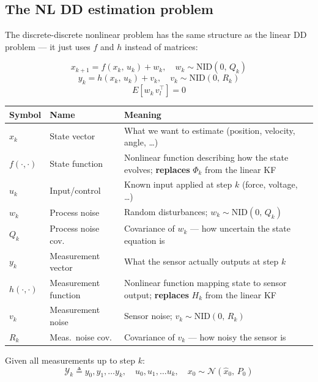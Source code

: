 \documentclass[12pt, a4paper]{article}
\begin{document}
\subsection*{The NL DD estimation problem}

The discrete-discrete nonlinear problem has the same structure as
the linear DD problem --- it just uses $f$ and $h$ instead of
matrices:

\[
  x_{k+1} = f(x_k,\, u_k) + w_k, \quad w_k \sim \mathrm{NID}(0,\, Q_k)
\]
\[
  y_k = h(x_k,\, u_k) + v_k, \quad v_k \sim \mathrm{NID}(0,\, R_k)
\]
\[
  E\!\left[w_k\, v_l^\top\right] = 0
\]

\begin{center}
\renewcommand{\arraystretch}{1.4}
\begin{tabular}{p{1.8cm} p{3.2cm} p{7.5cm}}
  \toprule
  \textbf{Symbol} & \textbf{Name} & \textbf{Meaning} \\
  \midrule
  $x_k$   & State vector        & What we want to estimate (position, velocity, angle, \ldots) \\
  $f(\cdot,\cdot)$ & State function & Nonlinear function describing how the state evolves; \textbf{replaces} $\Phi_k$ from the linear KF \\
  $u_k$   & Input/control       & Known input applied at step $k$ (force, voltage, \ldots) \\
  $w_k$   & Process noise       & Random disturbances; $w_k \sim \mathrm{NID}(0,\,Q_k)$ \\
  $Q_k$   & Process noise cov.  & Covariance of $w_k$ --- how uncertain the state equation is \\
  \midrule
  $y_k$   & Measurement vector  & What the sensor actually outputs at step $k$ \\
  $h(\cdot,\cdot)$ & Measurement function & Nonlinear function mapping state to sensor output; \textbf{replaces} $H_k$ from the linear KF \\
  $v_k$   & Measurement noise   & Sensor noise; $v_k \sim \mathrm{NID}(0,\,R_k)$ \\
  $R_k$   & Meas.\ noise cov.   & Covariance of $v_k$ --- how noisy the sensor is \\
  \bottomrule
\end{tabular}
\end{center}

Given all measurements up to step $k$:
\[
  \mathcal{Y}_k \triangleq y_0, y_1, \ldots y_k,\quad
  u_0, u_1, \ldots u_k, \quad
  x_0 \sim \mathcal{N}(\hat{x}_0,\, P_0)
\]
\end{document}
